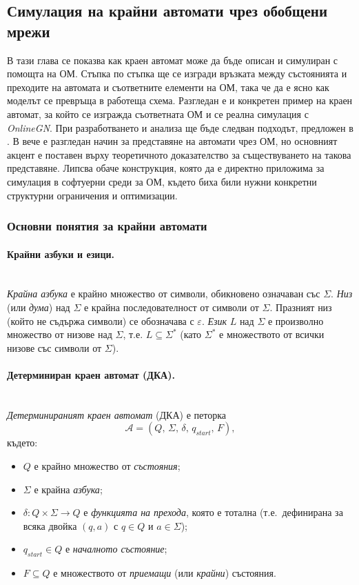 \subsection{Симулация на крайни автомати чрез обобщени мрежи}

\hspace*{2.5em}В тази глава се показва как краен автомат може да бъде описан и симулиран с помощта на ОМ. Стъпка по стъпка ще се изгради връзката между състоянията и преходите на автомата и съответните елементи на ОМ, така че да е ясно как моделът се превръща в работеща схема. Разгледан е и конкретен пример на краен автомат, за който се изгражда съответната ОМ и се реална симулация с \textit{OnlineGN}. 
При разработването и анализа ще бъде следван подходът, предложен в \cite{DimitrievAutomata}.
В \cite{Atanassov1985GNFA} вече е разгледан начин за представяне на автомати чрез ОМ, но основният акцент е поставен върху теоретичното доказателство за съществуването на такова представяне. Липсва обаче конструкция, която да е директно приложима за симулация в софтуерни среди за ОМ, където биха били нужни конкретни структурни ограничения и оптимизации.

\subsubsection{Основни понятия за крайни автомати}

\paragraph*{Крайни азбуки и езици.}
\mbox{}\\
\emph{Крайна азбука} е крайно множество от символи, обикновено означаван със $\Sigma$. \emph{Низ} (или \emph{дума}) над $\Sigma$ е крайна последователност от символи от $\Sigma$. Празният низ (който не съдържа символи) се обозначава с $\varepsilon$. \emph{Език} $L$ над $\Sigma$ е произволно множество от низове над $\Sigma$, т.е. $L \subseteq \Sigma^*$ (като $\Sigma^*$ е множеството от всички низове със символи от $\Sigma$).
\paragraph*{Детерминиран краен автомат (ДКА).}
\mbox{}\\
\label{def:DFA}
\emph{Детерминираният краен автомат} (ДКА) е петорка \cite{HopcroftMotwaniUllman,Kozen}
\[
\mathcal{A} = (Q,\, \Sigma,\, \delta,\, q_{\textit{start}},\, F),
\]
където:
\begin{itemize}
  \item $Q$ е крайно множество от \emph{състояния};
  \item $\Sigma$ е крайна \emph{азбука};
  \item $\delta : Q \times \Sigma \to Q$ е \emph{функцията на прехода}, която е тотална (т.е.\ дефинирана за всяка двойка $(q,a)$ с $q \in Q$ и $a \in \Sigma$);
  \item $q_{\textit{start}} \in Q$ е \emph{началното състояние};
  \item $F \subseteq Q$ е множеството от \emph{приемащи} (или \emph{крайни}) състояния.
\end{itemize}

